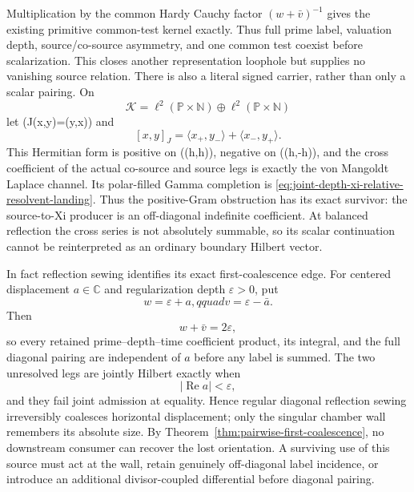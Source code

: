 \documentclass[11pt]{article}
\theoremstyle{definition}
\theoremstyle{remark}
\newcommand{\C}{\mathbb C}
\newcommand{\Rea}{\operatorname{Re}}
\begin{document}
Multiplication by the common Hardy Cauchy factor
\((w+\bar v)^{-1}\) gives the existing primitive common-test kernel
exactly.  Thus full prime label, valuation depth, source/co-source
asymmetry, and one common test coexist before scalarization.  This closes
another representation loophole but supplies no vanishing source relation.
There is also a literal signed carrier, rather than only a scalar pairing.
On
\[
 \mathcal K=\ell^2(\mathbb P\times\mathbb N)
              \oplus\ell^2(\mathbb P\times\mathbb N)
\]
let (J(x,y)=(y,x)) and
\[
 [x,y]_J=\langle x_+,y_-\rangle+\langle x_-,y_+\rangle.
\tag{3.7zf2}\label{eq:joint-depth-krein-pair}
\]
This Hermitian form is positive on ((h,h)), negative on ((h,-h)), and
the cross coefficient of the actual co-source and source legs is exactly
the von Mangoldt Laplace channel.  Its polar-filled Gamma completion is
\eqref{eq:joint-depth-xi-relative-resolvent-landing}.  Thus the positive-Gram
obstruction has its exact survivor: the source-to-Xi producer is an
off-diagonal indefinite coefficient.  At balanced reflection the cross
series is not absolutely summable, so its scalar continuation cannot be
reinterpreted as an ordinary boundary Hilbert vector.

In fact reflection sewing identifies its exact first-coalescence edge.  For
centered displacement \(a\in\C\) and regularization depth
\(\varepsilon>0\), put
\[
 w=\varepsilon+a,qquad v=\varepsilon-\bar a.
\]
Then
\[
                         w+\bar v=2\varepsilon,
\tag{3.7zg}\label{eq:reflected-common-test-diagonal-blindness}
\]
so every retained prime--depth--time coefficient product, its integral,
and the full diagonal pairing are independent of \(a\) before any label is
summed.  The two unresolved legs are jointly Hilbert exactly when
\[
                         |\Rea a|<\varepsilon,
\tag{3.7zh}\label{eq:reflected-common-test-hilbert-wall}
\]
and they fail joint admission at equality.  Hence regular diagonal
reflection sewing irreversibly coalesces horizontal displacement; only the
singular chamber wall remembers its absolute size.  By
Theorem~\ref{thm:pairwise-first-coalescence}, no downstream consumer can
recover the lost orientation.  A surviving use of this source must act at
the wall, retain genuinely off-diagonal label incidence, or introduce an
additional divisor-coupled differential before diagonal pairing.
\end{document}
